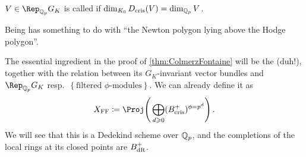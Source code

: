 \begin{rem}
	\begin{numerate}
		\item $V\in \Rep_{\IQ_p}G_K$ is called  if $\dim_{K_0}D_{\mathrm{cris}}(V)=\dim_{\mathbb{Q}_p}V$.
		\item Being  has something to do with \enquote{the Newton polygon lying above the Hodge polygon}.
		\item The essential ingredient in the proof of \cref{thm:ColmerzFontaine} will be the  (duh!), together with the relation between its $G_K$-invariant vector bundles and $\Rep_{\IQ_p}G_K$ resp.\ $\left\{\text{filtered }\phi\text{-modules}\right\}$. We can already define it as
		\begin{equation*}
			X_\FFC\coloneqq \Proj\Bigg(\bigoplus_{d\geq 0}(B_\cris^+)^{\phi=p^d}\Bigg)\,.
		\end{equation*}
		We will see that this is a Dedekind scheme over $\mathbb{Q}_p$, and the completions of the local rings at its closed points are $B_{\mathrm{dR}}^+$.
	\end{numerate}
\end{rem}

